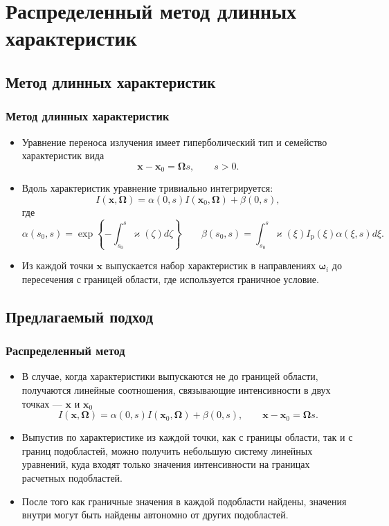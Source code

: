 \documentclass[unicode,aspectratio=43]{beamer}
\newcommand{\I}{\mathrm{\mathit{I}}}
\newcommand{\Ip}{\mathrm{\mathit{I}}_\text{p}}
\renewcommand{\vec}[1]{\boldsymbol{\mathbf{#1}}}
\begin{document}

\section{Распределенный метод длинных характеристик}
\subsection{Метод длинных характеристик}

\begin{frame}\frametitle{Метод длинных характеристик}
	\begin{itemize}
	\item Уравнение переноса излучения имеет гиперболический тип и семейство
характеристик вида
	\[
		\vec x - \vec x_0 = \vec \Omega s, \qquad s > 0.
	\]
	\item Вдоль характеристик уравнение тривиально интегрируется:
	\[
		\I(\vec x, \vec \Omega) = \alpha(0, s) \I(\vec x_0, \vec \Omega) + \beta(0, s),
	\]
	где
	\[
		\alpha(s_0, s) = \exp\left\{-\int_{s_0}^s \varkappa(\zeta) d\zeta\right\}
		\qquad
		\beta(s_0, s) = \int_{s_0}^s \varkappa(\xi) \Ip(\xi) \alpha(\xi, s) d\xi.
	\]
	\item Из каждой точки $\vec x$ выпускается набор характеристик в
направлениях $\vec \omega_i$ до
пересечения с границей области, где используется граничное условие.
	\end{itemize}
\end{frame}

\subsection{Предлагаемый подход}
\begin{frame}\frametitle{Распределенный метод}
	\begin{itemize}
	\item В случае, когда характеристики выпускаются не до границей
области, получаются линейные соотношения, связывающие
интенсивности в двух точках --- $\vec x$ и $\vec x_0$
\[
\I(\vec x, \vec \Omega) = \alpha(0, s) \I(\vec x_0, \vec \Omega) + \beta(0, s),
\qquad \vec x - \vec x_0 = \vec \Omega s.
\]
	\item Выпустив по характеристике из каждой точки, как с границы области, так
и с границ подобластей, можно получить небольшую систему линейных уравнений,
куда входят только значения интенсивности на границах расчетных подобластей.

	\item После того как граничные значения в каждой подобласти найдены, значения
внутри могут быть найдены автономно от других подобластей.
	\end{itemize}
\end{frame}
\end{document}
